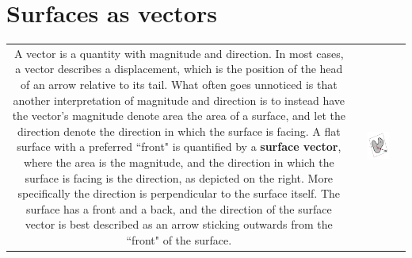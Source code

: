 \documentclass{article}
\begin{document}
\section*{Surfaces as vectors}

\begin{tabular}{cc}
\parbox{0.5\textwidth}{
A vector is a quantity with magnitude and direction. In most cases, a vector describes a displacement, which is the position of the head of an arrow relative to its tail. What often goes unnoticed is that another interpretation of magnitude and direction is to instead have the vector's magnitude denote area the area of a surface, and let the direction denote the direction in which the surface is facing. A flat surface with a preferred ``front" is quantified by a {\bf surface vector}, where the area is the magnitude, and the direction in which the surface is facing is the direction, as depicted on the right. More specifically the direction is perpendicular to the surface itself. The surface has a front and a back, and the direction of the surface vector is best described as an arrow sticking outwards from the ``front" of the surface. 
} & \parbox{0.5\textwidth}{\includegraphics[width = 0.5\textwidth]{surface_vector_no_boundary}}
\end{tabular}
\end{document}
